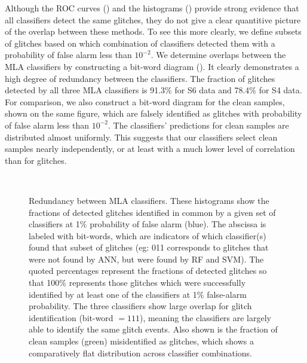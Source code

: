 \documentclass[prd, twocolumn, lengthcheck, superscriptaddress, showpacs, letterpaper, nofootinbib]{revtex4-1}
\begin{document}
Although the \ac{ROC} curves () and the histograms () provide strong evidence that all classifiers detect the same glitches, they do not give a clear quantitive picture of the overlap between these methods. To see this more clearly, we define subsets of glitches based on which combination of classifiers detected them with a probability of false alarm less than $10^{-2}$. We determine overlaps between the \ac{MLA} classifiers by constructing a bit-word diagram (). It clearly demonstrates a high degree of redundancy between the classifiers. The fraction of glitches detected by all three \ac{MLA} classifiers is 91.3\% for S6 data and 78.4\% for S4 data. For comparison, we also construct a bit-word diagram for the clean samples, shown on the same figure, which are falsely identified as glitches with probability of false alarm less than $10^{-2}$. The classifiers' predictions for clean samples are distributed almost uniformly. This suggests that our classifiers select clean samples nearly independently, or at least with a much lower level of correlation than for glitches.


\begin{figure}[h!]
\centering
{}\\
        \caption{Redundancy between \ac{MLA} classifiers. These histograms show
            the fractions of detected glitches identified in common by a given
            set of classifiers at 1\% probability of false alarm (blue). The
            abscissa is labeled with bit-words, which are indicators of which
            classifier(s) found that subset of glitches (eg: 011 corresponds to
            glitches that were not found by \ac{ANN}, but were found by \ac{RF}
            and \ac{SVM}). The quoted percentages represent the fractions of
            detected glitches so that 100\% represents those glitches which were
            successfully identified by at least one of the classifiers at 1\%
            false-alarm probability. The three classifiers show large overlap
            for glitch identification (bit-word $= 111$), meaning the classifiers
            are largely able to identify the same glitch events. Also shown is the
            fraction of clean samples (green) misidentified as glitches, which
            shows a comparatively flat distribution across classifier
            combinations.}\label{fig:bit_word_mvc}
\label{fig:bit_word_mvc}
\end{figure}
\end{document}
